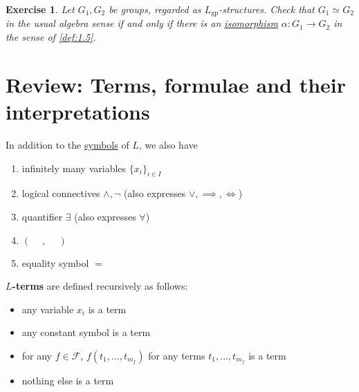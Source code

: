 \documentclass{article}
\newtheorem{nexercise}[nthm]{Exercise}
\newcommand{\named}[1]{\textbf{#1}\index{#1}}
\begin{document}

\begin{nexercise}\label{ex:1.6}
  Let $G_1, G_2$ be groups, regarded as \hyperlink{def:lgp}{$L_{\text{gp}}$}-structures.
  Check that $G_1 \simeq G_2$ in the usual algebra sense if and only if there is an \hyperlink{def:iso}{isomorphism} $\alpha: G_1 \to G_2$ in the sense of \cref{def:1.5}.
\end{nexercise}

\clearpage
\section{Review: Terms, formulae and their interpretations}
In addition to the \hyperlink{def:lang}{symbols} of $L$, we also have
\begin{enumerate}[label=(\roman*)]
  \item infinitely many variables $\{x_i\}_{i \in I}$
  \item logical connectives $\wedge, \neg$ (also expresses $\vee, \implies, \iff$)
    \item quantifier $\exists$ (also expresses $\forall$)
    \item $(\phantom{-},\phantom{-})$
    \item equality symbol $=$
\end{enumerate}

\begin{ndef}\label{def:2.1}
  \textbf{$L$-terms} are defined recursively as follows:
  \begin{itemize}[label=--]
    \item any variable $x_i$ is a term
    \item any constant symbol is a term
    \item for any $f \in \mathscr{F}$, $f(t_1, \dotsc, t_{m_f})$ for any terms $t_1, \dotsc, t_{m_f}$ is a term
    \item nothing else is a term
  \end{itemize}
\end{ndef}
\end{document}
